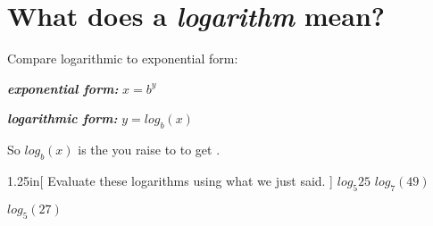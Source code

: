 \section{What does a {\itshape logarithm} mean?}

Compare logarithmic to exponential form:

\begin{tcbraster}[
    raster equal height,
    raster column skip=0.5in, 
    raster left skip = .5in, raster right skip=.5in,
    raster before skip=\onelineskip, raster after skip=\onelineskip,
    ]
    \begin{tcolorbox}
        {\bfseries\itshape exponential form:}
        \centering\large
        $x = b^y $
    \end{tcolorbox}
    \begin{tcolorbox}
        {\bfseries\itshape logarithmic form:}
        \centering\large
        $y = log_b(x) $
    \end{tcolorbox}
\end{tcbraster}


So $log_b(x)$ is 
the  you raise  to to get .

\begin{my2Problems}{1.25in}[%
    Evaluate these logarithms using what we just said.
]
{$log_{5}{25}$}
{$log_{7}(49)$}
\end{my2Problems}
\begin{myProblem}{1.25in}
    {$log_{5}(27)$}
\end{myProblem}